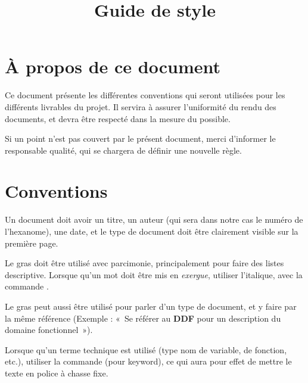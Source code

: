

\title{Guide de style}


\maketitle
\section{À propos de ce document}
Ce document présente les différentes conventions qui seront utilisées pour les
différents livrables du projet. Il servira à assurer l'uniformité du rendu des
documents, et devra être respecté dans la mesure du possible.

Si un point n'est pas couvert par le présent document, merci d'informer le
responsable qualité, qui se chargera de définir une nouvelle règle.

\section{Conventions}
Un document doit avoir un titre, un auteur (qui sera dans notre cas le numéro
de l'hexanome), une date, et le type de document doit être clairement visible
sur la première page.

Le gras doit être utilisé avec parcimonie, principalement pour faire des listes
descriptive. Lorsque qu'un mot doit être mis en \emph{exergue}, utiliser l'italique,
avec la commande .

Le gras peut aussi être utilisé pour parler d'un type de document, et y faire
par la même référence (Exemple : «~Se référer au \textbf{DDF} pour un
description du domaine fonctionnel~»).

Lorsque qu'un terme technique est utilisé (type nom de variable, de fonction,
etc.), utiliser la commande  (pour keyword), ce qui aura pour effet de
mettre le texte en police à chasse fixe.




